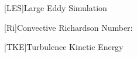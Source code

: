 \begin{acronym}
[LES]{Large Eddy Simulation}
\end{acronym}

\begin{acronym}
[Ri]{Convective Richardson Number:}
\end{acronym}

\begin{acronym}
[TKE]{Turbulence Kinetic Energy}
\end{acronym}




\endinput




